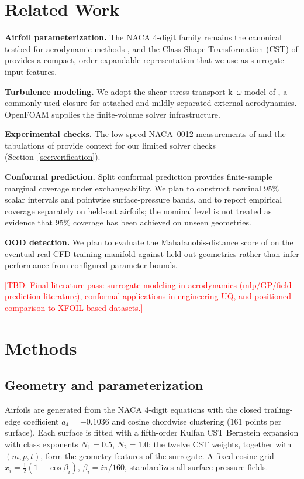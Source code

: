 \documentclass[11pt]{article}
\newcommand{\TBD}[1]{\textcolor{red}{[TBD: #1]}}
\begin{document}
\section{Related Work}
\label{sec:related}

\textbf{Airfoil parameterization.} The NACA 4-digit family remains the
canonical testbed for aerodynamic methods \citep{abbott1959}, and the
Class-Shape Transformation (CST) of \citet{kulfan2008} provides a compact,
order-expandable representation that we use as surrogate input features.

\textbf{Turbulence modeling.} We adopt the shear-stress-transport
k--$\omega$ model of \citet{menter1994}, a commonly used closure for
attached and mildly separated external aerodynamics. OpenFOAM
\citep{weller1998} supplies the finite-volume solver infrastructure.

\textbf{Experimental checks.} The low-speed NACA~0012 measurements of
\citet{ladson1988} and the tabulations of \citet{abbott1959} provide context for
our limited solver checks (Section~\ref{sec:verification}).

\textbf{Conformal prediction.} Split conformal prediction
\citep{papadopoulos2002, vovk2005} provides finite-sample marginal coverage
under exchangeability. We plan to construct nominal 95\% scalar intervals and
pointwise surface-pressure bands, and to report empirical coverage separately on
held-out airfoils; the nominal level is not treated as evidence that 95\%
coverage has been achieved on unseen geometries.

\textbf{OOD detection.} We plan to evaluate the Mahalanobis-distance score of
\citet{lee2018} on the eventual real-CFD training manifold against held-out
geometries rather than infer performance from configured parameter bounds.

\TBD{Final literature pass: surrogate modeling in aerodynamics
(mlp/GP/field-prediction literature), conformal applications in engineering
UQ, and positioned comparison to XFOIL-based datasets.}

\section{Methods}
\label{sec:methods}

\subsection{Geometry and parameterization}
Airfoils are generated from the NACA 4-digit equations with the closed
trailing-edge coefficient $a_4=-0.1036$ and cosine chordwise clustering
(161 points per surface). Each surface is fitted with a fifth-order Kulfan CST
Bernstein expansion \citep{kulfan2008} with class exponents
$N_1=0.5$, $N_2=1.0$; the twelve CST weights, together with $(m, p, t)$,
form the geometry features of the surrogate. A fixed cosine grid
$x_i = \tfrac12(1-\cos \beta_i)$, $\beta_i = i\pi/160$, standardizes all
surface-pressure fields.
\end{document}
